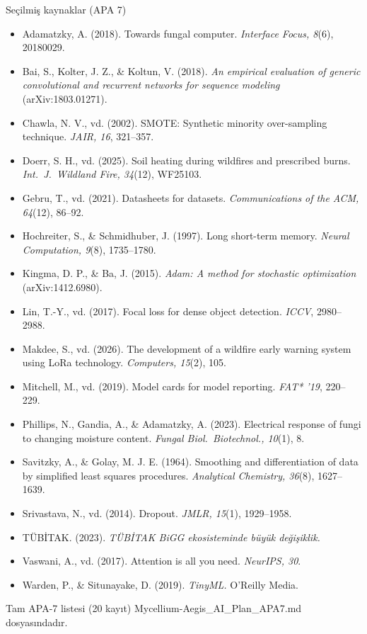\documentclass[aspectratio=169,11pt]{beamer}
\newcommand{\src}[1]{{\scriptsize\color{aegisLeaf}#1}}
\begin{document}
\begin{frame}[allowframebreaks]{Seçilmiş kaynaklar (APA 7)}
  \footnotesize
  \begin{itemize}
    \item Adamatzky, A. (2018). Towards fungal computer. \emph{Interface Focus, 8}(6), 20180029.
    \item Bai, S., Kolter, J. Z., \& Koltun, V. (2018). \emph{An empirical evaluation of generic convolutional and recurrent networks for sequence modeling} (arXiv:1803.01271).
    \item Chawla, N. V., vd. (2002). SMOTE: Synthetic minority over-sampling technique. \emph{JAIR, 16}, 321--357.
    \item Doerr, S. H., vd. (2025). Soil heating during wildfires and prescribed burns. \emph{Int.\ J.\ Wildland Fire, 34}(12), WF25103.
    \item Gebru, T., vd. (2021). Datasheets for datasets. \emph{Communications of the ACM, 64}(12), 86--92.
    \item Hochreiter, S., \& Schmidhuber, J. (1997). Long short-term memory. \emph{Neural Computation, 9}(8), 1735--1780.
    \item Kingma, D. P., \& Ba, J. (2015). \emph{Adam: A method for stochastic optimization} (arXiv:1412.6980).
    \item Lin, T.-Y., vd. (2017). Focal loss for dense object detection. \emph{ICCV}, 2980--2988.
    \item Makdee, S., vd. (2026). The development of a wildfire early warning system using LoRa technology. \emph{Computers, 15}(2), 105.
    \item Mitchell, M., vd. (2019). Model cards for model reporting. \emph{FAT* '19}, 220--229.
    \item Phillips, N., Gandia, A., \& Adamatzky, A. (2023). Electrical response of fungi to changing moisture content. \emph{Fungal Biol.\ Biotechnol., 10}(1), 8.
    \item Savitzky, A., \& Golay, M. J. E. (1964). Smoothing and differentiation of data by simplified least squares procedures. \emph{Analytical Chemistry, 36}(8), 1627--1639.
    \item Srivastava, N., vd. (2014). Dropout. \emph{JMLR, 15}(1), 1929--1958.
    \item TÜBİTAK. (2023). \emph{TÜBİTAK BiGG ekosisteminde büyük değişiklik.}
    \item Vaswani, A., vd. (2017). Attention is all you need. \emph{NeurIPS, 30}.
    \item Warden, P., \& Situnayake, D. (2019). \emph{TinyML.} O'Reilly Media.
  \end{itemize}
  \src{Tam APA-7 listesi (20 kayıt) Mycellium-Aegis\_AI\_Plan\_APA7.md dosyasındadır.}
\end{frame}
\end{document}

